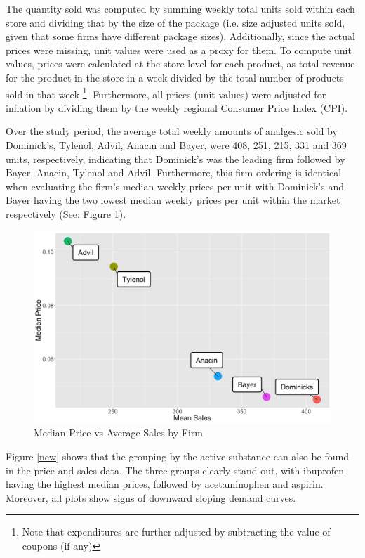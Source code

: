 \documentclass[12pt, authoryear]{elsarticle}
\begin{document}
The quantity sold was computed by summing weekly total units sold within each store and dividing that by the size of the package (i.e. size adjusted units sold, given that some firms have different package sizes). Additionally, since the actual prices were missing, unit values were used as a proxy for them. To compute unit values, prices were calculated at the store level for each product, as total revenue for the product in the store in a week divided by the total number of products sold in that week \footnote{Note that expenditures are further adjusted by subtracting the value of coupons (if any)}. Furthermore, all prices (unit values) were adjusted for inflation by dividing them by the weekly regional Consumer Price Index (CPI).

Over the study period, the average total weekly amounts of analgesic sold by Dominick's, Tylenol, Advil, Anacin and Bayer, were 408, 251, 215, 331  and 369 units, respectively, indicating that Dominick’s was the leading firm followed by Bayer, Anacin, Tylenol and Advil. Furthermore, this firm ordering is identical when evaluating the firm's median weekly prices per unit with Dominick's and Bayer having the two lowest median weekly prices per unit within the market respectively (See: Figure \ref{p_v_s}).

\begin{figure}[H]
	\centering
	\includegraphics[clip, angle=0, width=12cm]{firm_plot.png}
	\caption{ Median Price vs Average Sales by Firm}\label{p_v_s}
\end{figure}

Figure \ref{new} shows that the grouping by the active substance can also be found in the price and sales data. The three groups clearly stand out, with ibuprofen having the highest median prices, followed by acetaminophen and aspirin. Moreover, all plots show signs of downward sloping demand curves.
\end{document}
